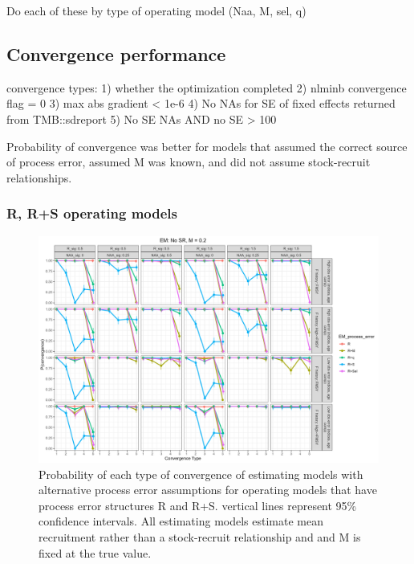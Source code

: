 \documentclass[
  12pt,
]{article}
\begin{document}
Do each of these by type of operating model (Naa, M, sel, q)

\hypertarget{convergence-performance}{%
\subsection{Convergence performance}\label{convergence-performance}}

convergence types: 1) whether the optimization completed 2) nlminb
convergence flag = 0 3) max abs gradient \textless{} 1e-6 4) No NAs for
SE of fixed effects returned from TMB::sdreport 5) No SE NAs AND no SE
\textgreater{} 100

Probability of convergence was better for models that assumed the
correct source of process error, assumed M was known, and did not assume
stock-recruit relationships.

\hypertarget{r-rs-operating-models}{%
\subsubsection{R, R+S operating models}\label{r-rs-operating-models}}

\begin{landscape}
\begin{figure}
\caption{Probability of each type of convergence of estimating models with alternative process error assumptions for operating models that have process error structures R and R+S. vertical lines represent 95\% confidence intervals. All estimating models estimate mean recruitment rather than a stock-recruit relationship and and M is fixed at the true value.}\label{naa_om_em_R_MF_convergence}
\begin{center}
\includegraphics[width = \textwidth]{naa_om_p_convergence_meanR_M_fixed.png}
\end{center}
\end{figure}
\end{landscape}
\end{document}
